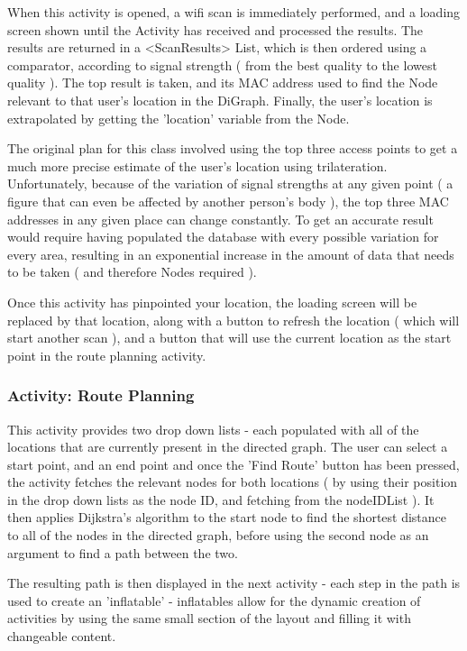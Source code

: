 \documentclass[11pt]{informatics-report}
\begin{document}
When this activity is opened, a wifi scan is immediately performed, and a loading screen shown until the Activity has received and processed the results. The results are returned in a <ScanResults> List, which is then ordered using a comparator, according to signal strength ( from the best quality to the lowest quality ). The top result is taken, and its MAC address used to find the Node relevant to that user's location in the DiGraph. Finally, the user's location is extrapolated by getting the 'location' variable from the Node.

The original plan for this class involved using the top three access points to get a much more precise estimate of the user's location using trilateration. Unfortunately, because of the variation of signal strengths at any given point ( a figure that can even be affected by another person's body ), the top three MAC addresses in any given place can change constantly. To get an accurate result would require having populated the database with every possible variation for every area, resulting in an exponential increase in the amount of data that needs to be taken ( and therefore Nodes required ). 

Once this activity has pinpointed your location, the loading screen will be replaced by that location, along with a button to refresh the location ( which will start another scan ), and a button that will use the current location as the start point in the route planning activity.

\subsubsection{Activity: Route Planning}

This activity provides two drop down lists - each populated with all of the locations that are currently present in the directed graph. The user can select a start point, and an end point and once the 'Find Route' button has been pressed, the activity fetches the relevant nodes for both locations ( by using their position in the drop down lists as the node ID, and fetching from the nodeIDList ). It then applies Dijkstra's algorithm to the start node to find the shortest distance to all of the nodes in the directed graph, before using the second node as an argument to find a path between the two.

The resulting path is then displayed in the next activity - each step in the path is used to create an 'inflatable' - inflatables allow for the dynamic creation of activities by using the same small section of the layout and filling it with changeable content.
\end{document}

